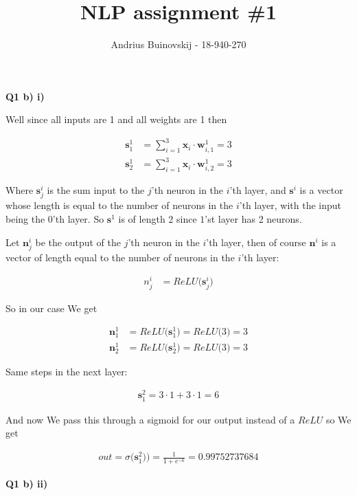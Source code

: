 \documentclass{article}
\begin{document}
\title{NLP assignment \#1}
\author{Andrius Buinovskij - 18-940-270}
\date{}

\maketitle

\textbf{Q1 b) i)}
	
	Well since all inputs are 1 and all weights are 1 then
	
	\begin{align}
		\mathbf{s}^1_1 &= \sum^3_{i=1} \mathbf{x}_i\cdot \mathbf{w}^1_{i, 1} = 3\\
		\mathbf{s}^1_2 &= \sum^3_{i=1} \mathbf{x}_i\cdot \mathbf{w}^1_{i, 2} = 3
	\end{align}
	
	Where $\mathbf{s}^i_j$ is the sum input to the $j$'th neuron in the $i$'th layer, and $\mathbf{s}^i$ is a vector whose length is equal to the number of neurons in the $i$'th layer, with the input being the $0$'th layer. So $\mathbf{s}^1$ is of length 2 since $1$'st layer has 2 neurons. 
	
	Let $\mathbf{n}^i_j$ be the output of the $j$'th neuron in the $i$'th layer, then of course $\mathbf{n}^i$ is a vector of length equal to the number of neurons in the $i$'th layer:
	
	\begin{align}
		n^i_j &= ReLU\big(\mathbf{s}^i_j\big)
	\end{align}
	
	So in our case We get
	
	\begin{align}
		\mathbf{n}^1_1 &= ReLU\big(\mathbf{s}^1_1\big) =  ReLU\big( 3 \big) = 3\\
	\mathbf{n}^1_2 &= ReLU\big(\mathbf{s}^1_2\big) =  ReLU\big( 3 \big) = 3	
	\end{align}
	
	Same steps in the next layer:
	
	\begin{align}
		\mathbf{s}^2_1 = 3\cdot 1 + 3\cdot 1 = 6
	\end{align}
	
	And now We pass this through a sigmoid for our output instead of a $ReLU$ so We get
	
	\begin{align}
		out = \sigma\big(\mathbf{s}^2_1)\big) = \frac{1}{1+e^{-6}} = 0.99752737684
	\end{align}

\textbf{Q1 b) ii)}
\end{document}
